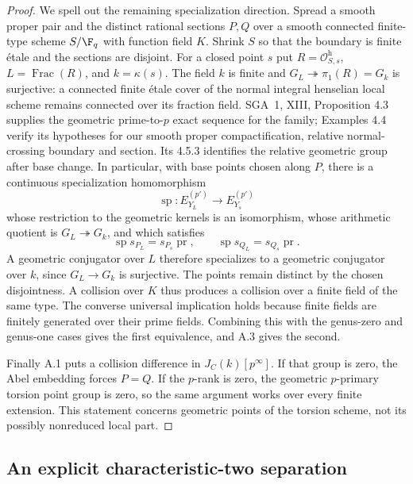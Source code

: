 \begin{proof}
We spell out the remaining specialization direction. Spread a
smooth proper pair and the distinct rational sections $P,Q$ over
a smooth connected finite-type scheme $S/\F_q$ with function
field $K$. Shrink $S$ so that the boundary is finite \'etale and
the sections are disjoint. For a closed point $s$ put
$R=\mathcal O_{S,s}^{\mathrm h}$, $L=\operatorname{Frac}(R)$,
and $k=\kappa(s)$. The field $k$ is finite and
$G_L\twoheadrightarrow\pi_1(R)=G_k$ is surjective: a connected
finite \'etale cover of the normal integral henselian local
scheme remains connected over its fraction field.
SGA~1, XIII, Proposition 4.3 supplies the geometric
prime-to-$p$ exact sequence for the family; Examples 4.4 verify
its hypotheses for our smooth proper compactification, relative
normal-crossing boundary and section. Its 4.5.3 identifies the
relative geometric group after base change. In particular,
with base points chosen along $P$, there is a continuous
specialization homomorphism
\[
 \operatorname{sp}:E_{Y_L}^{(p')}\longrightarrow E_{Y_s}^{(p')}
\]
whose restriction to the geometric kernels is an isomorphism,
whose arithmetic quotient is $G_L\twoheadrightarrow G_k$, and
which satisfies
\[
 \operatorname{sp}s_{P_L}=s_{P_s}\operatorname{pr},\qquad
 \operatorname{sp}s_{Q_L}=s_{Q_s}\operatorname{pr}.
\]
A geometric conjugator over $L$ therefore specializes to a
geometric conjugator over $k$, since $G_L\to G_k$ is surjective.
The points remain distinct by the chosen disjointness. A collision
over $K$ thus produces a collision over a finite field of the same
type. The converse universal implication holds because finite
fields are finitely generated over their prime fields.
Combining this with the genus-zero and genus-one cases gives the
first equivalence, and A.3 gives the second.

Finally A.1 puts a collision difference in $J_C(k)[p^\infty]$.
If that group is zero, the Abel embedding forces $P=Q$. If the
$p$-rank is zero, the geometric $p$-primary torsion point group
is zero, so the same argument works over every finite extension.
This statement concerns geometric points of the torsion scheme,
not its possibly nonreduced local part.
\end{proof}

\subsection{An explicit characteristic-two separation}

